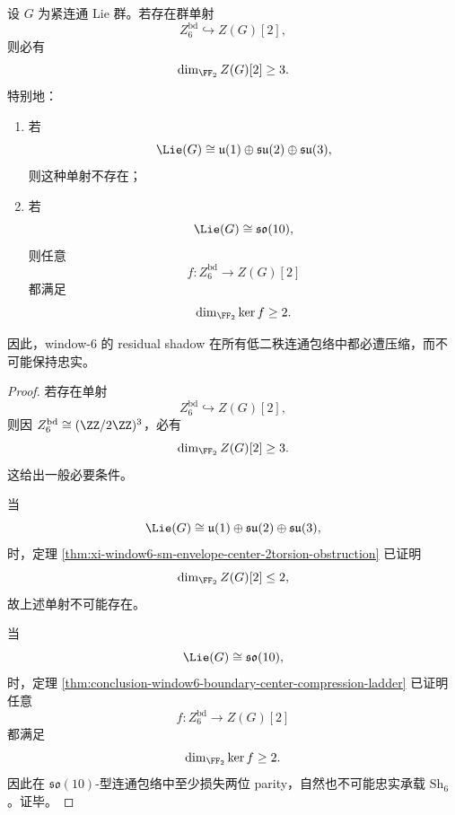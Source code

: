 
\begin{theorem}[低二秩连续包络上的强制压缩]\label{thm:conclusion-window6-low-two-rank-envelope-forced-compression}
设 \(G\) 为紧连通 Lie 群。若存在群单射
\[
Z_6^{\mathrm{bd}}\hookrightarrow Z(G)[2],
\]
则必有
\[
\dim_{\FF_2} Z(G)[2]\ge 3.
\]
特别地：
\begin{enumerate}
  \item 若
  \[
  \Lie(G)\cong \mathfrak u(1)\oplus\mathfrak{su}(2)\oplus\mathfrak{su}(3),
  \]
  则这种单射不存在；
  \item 若
  \[
  \Lie(G)\cong \mathfrak{so}(10),
  \]
  则任意
  \[
  f:Z_6^{\mathrm{bd}}\to Z(G)[2]
  \]
  都满足
  \[
  \dim_{\FF_2}\ker f\ge 2.
  \]
\end{enumerate}
因此，window-\(6\) 的 residual shadow 在所有低二秩连通包络中都必遭压缩，而不可能保持忠实。
\end{theorem}
\begin{proof}
若存在单射
\[
Z_6^{\mathrm{bd}}\hookrightarrow Z(G)[2],
\]
则因 \(Z_6^{\mathrm{bd}}\cong (\ZZ/2\ZZ)^3\)，必有
\[
\dim_{\FF_2} Z(G)[2]\ge 3.
\]
这给出一般必要条件。

当
\[
\Lie(G)\cong \mathfrak u(1)\oplus\mathfrak{su}(2)\oplus\mathfrak{su}(3),
\]
时，定理 \ref{thm:xi-window6-sm-envelope-center-2torsion-obstruction} 已证明
\[
\dim_{\FF_2} Z(G)[2]\le 2,
\]
故上述单射不可能存在。

当
\[
\Lie(G)\cong \mathfrak{so}(10),
\]
时，定理 \ref{thm:conclusion-window6-boundary-center-compression-ladder} 已证明任意
\[
f:Z_6^{\mathrm{bd}}\to Z(G)[2]
\]
都满足
\[
\dim_{\FF_2}\ker f\ge 2.
\]
因此在 \(\mathfrak{so}(10)\)-型连通包络中至少损失两位 parity，自然也不可能忠实承载 \(\mathrm{Sh}_6\)。证毕。
\end{proof}

